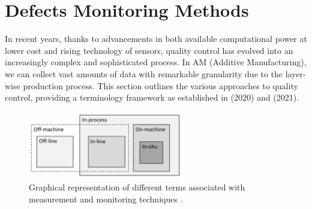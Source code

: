 
\section{Defects Monitoring Methods}
\label{sec:comelotrovo}
In recent years, thanks to advancements in both available computational power at lower cost and rising technology of sensors, quality control has evolved into an increasingly complex and sophisticated process. In AM (Additive Manufacturing), we can collect vast amounts of data with remarkable granularity due to the layer-wise production process. This section outlines the various approaches to quality control, providing a terminology framework as established in \citeauthor{richard_leach_integrated_2020} (2020) and \citeauthor{grasso_-situ_2021} (2021).
\begin{figure}
    \centering
    \includegraphics[width=0.6\textwidth]{Images/dovevai.png}
    \caption[Measurement and monitoring techniques.]{Graphical representation of different terms associated with measurement and monitoring techniques \cite{richard_leach_integrated_2020}.}
    \label{fig:dovevai}
\end{figure}

